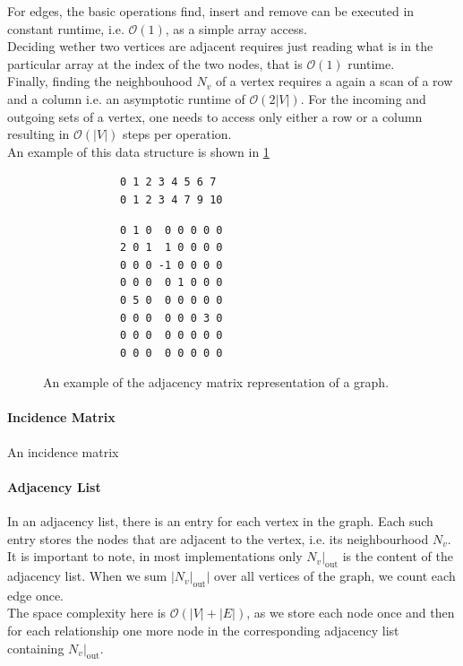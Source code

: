        For edges, the basic operations find, insert and remove can be executed in constant runtime, i.e. $\mathcal{O}(1)$, as a simple array access. \\
        
        Deciding wether two vertices are adjacent requires just reading what is in the particular array at the index of the two nodes, that is $\mathcal{O}(1)$ runtime.\\
        
        Finally, finding the neighbouhood $N_v$ of a vertex requires a again a scan of a row and a column i.e. an asymptotic runtime of $\mathcal{O}(2|V|)$. For the incoming and outgoing sets of a vertex, one needs to access only either a row or a column resulting in $\mathcal{O}(|V|)$ steps per operation. \\
        
        An example of this data structure is shown in \ref{edgelist}
        
        \begin{figure}[htp]\label{edgelist}
         \begin{center}
         \begin{verbatim}
            0 1 2 3 4 5 6 7
            0 1 2 3 4 7 9 10
          \end{verbatim}
          \begin{verbatim}
            0 1 0  0 0 0 0 0
            2 0 1  1 0 0 0 0
            0 0 0 -1 0 0 0 0
            0 0 0  0 1 0 0 0
            0 5 0  0 0 0 0 0
            0 0 0  0 0 0 3 0
            0 0 0  0 0 0 0 0
            0 0 0  0 0 0 0 0
          \end{verbatim}
         \end{center}
         \caption{An example of the adjacency matrix representation of a graph.}
        \end{figure}
        
        \paragraph{Incidence Matrix}
        An incidence matrix
        
        \paragraph{Adjacency List}
        In an adjacency list, there is an entry for each vertex in the graph. 
        Each such entry stores the nodes that are adjacent to the vertex, i.e. its neighbourhood $N_v$. 
        It is important to note, in most implementations only $N_v |_\text{out}$ is the content of the adjacency list.
        When we sum $|N_v |_\text{out}|$ over all vertices of the graph, we count each edge once.\\
        The space complexity here is $\mathcal{O}(|V| + |E|)$, as we store each node once and then for each relationship one more node in the corresponding adjacency list containing $N_v |_\text{out}$.

